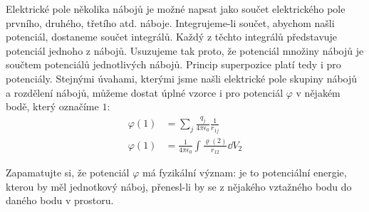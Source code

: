     Elektrické pole několika nábojů je možné napsat jako součet elektrického pole prvního, druhého, 
    třetího atd. náboje. Integrujeme-li součet, abychom našli potenciál, dostaneme součet 
    integrálů. Každý z těchto integrálů představuje potenciál jednoho z nábojů. Usuzujeme tak 
    proto, že potenciál množiny nábojů je součtem potenciálů jednotlivých nábojů. Princip 
    superpozice platí tedy i pro potenciály. Stejnými úvahami, kterými jsme našli elektrické pole 
    skupiny nábojů a rozdělení nábojů, můžeme dostat úplné vzorce i pro potenciál \(\varphi\) v 
    nějakém bodě, který označíme \(1\):
    \begin{align}
     \varphi(1) &= 
       \sum\limits_{j}\frac{q_j}{4\pi\epsilon_0}\frac{1}{r_{1j}}     \label{fyz:fey_eq_elstat24} \\ 
     \varphi(1) &= 
       \frac{1}{4\pi\epsilon_0}\int\frac{\varrho(2)}{r_{12}}\dd{V_2} \label{fyz:fey_eq_elstat25}
    \end{align}
     	    
    Zapamatujte si, že potenciál \(\varphi\) má fyzikální význam: je to potenciální energie, kterou 
    by měl jednotkový náboj, přenesl-li by se z nějakého vztažného bodu do daného bodu v prostoru.
    
